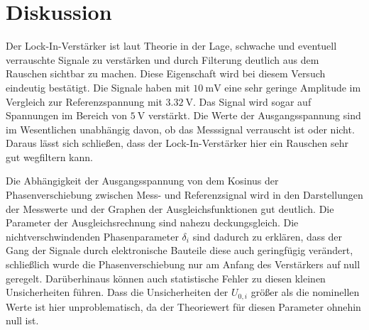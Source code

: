 \section{Diskussion}
\label{sec:Diskussion}
Der Lock-In-Verstärker ist laut Theorie in der Lage, schwache und eventuell
verrauschte Signale zu verstärken und durch Filterung deutlich aus dem Rauschen
sichtbar zu machen. Diese Eigenschaft wird bei diesem Versuch eindeutig bestätigt.
Die Signale haben mit $\SI{10}{\milli\volt}$ eine sehr geringe Amplitude im Vergleich
zur Referenzspannung mit $\SI{3,32}{\volt}$. Das Signal wird sogar auf Spannungen im Bereich
von $\SI{5}{\volt}$ verstärkt. Die Werte der Ausgangsspannung sind im Wesentlichen
unabhängig davon, ob das Messsignal verrauscht ist oder nicht. Daraus lässt sich
schließen, dass der Lock-In-Verstärker hier ein Rauschen sehr gut wegfiltern kann.

Die Abhängigkeit der Ausgangsspannung von dem Kosinus der Phasenverschiebung zwischen
Mess- und Referenzsignal wird in den Darstellungen der Messwerte und der Graphen
der Ausgleichsfunktionen gut deutlich. Die Parameter der Ausgleichsrechnung sind
nahezu deckungsgleich. Die nichtverschwindenden Phasenparameter $\delta_i$ sind
dadurch zu erklären, dass der Gang der Signale durch elektronische Bauteile diese
auch geringfügig verändert, schließlich wurde die Phasenverschiebung nur am
Anfang des Verstärkers auf null geregelt. Darüberhinaus können auch statistische
Fehler zu diesen kleinen Unsicherheiten führen.
Dass die Unsicherheiten der $U_{0,i}$ größer als die nominellen Werte ist hier unproblematisch,
da der Theoriewert für diesen Parameter ohnehin null ist. 
